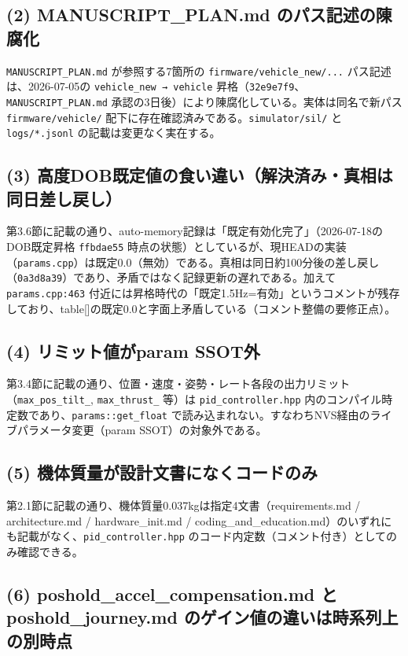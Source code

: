 \documentclass[a4paper,10pt]{ltjsarticle}
\begin{document}
\subsection*{(2) MANUSCRIPT\_PLAN.md のパス記述の陳腐化}

\texttt{MANUSCRIPT\_PLAN.md} が参照する7箇所の \texttt{firmware/vehicle\_new/...} パス記述は、2026-07-05の \texttt{vehicle\_new → vehicle} 昇格（\texttt{32e9e7f9}、\texttt{MANUSCRIPT\_PLAN.md} 承認の3日後）により陳腐化している。実体は同名で新パス \texttt{firmware/vehicle/} 配下に存在確認済みである。\texttt{simulator/sil/} と \texttt{logs/*.jsonl} の記載は変更なく実在する。

\subsection*{(3) 高度DOB既定値の食い違い（解決済み・真相は同日差し戻し）}

第3.6節に記載の通り、auto-memory記録は「既定有効化完了」（2026-07-18のDOB既定昇格 \texttt{ffbdae55} 時点の状態）としているが、現HEADの実装（\texttt{params.cpp}）は既定0.0（無効）である。真相は同日約100分後の差し戻し（\texttt{0a3d8a39}）であり、矛盾ではなく記録更新の遅れである。加えて \texttt{params.cpp:463} 付近には昇格時代の「既定1.5Hz=有効」というコメントが残存しており、table[]の既定0.0と字面上矛盾している（コメント整備の要修正点）。

\subsection*{(4) リミット値がparam SSOT外}

第3.4節に記載の通り、位置・速度・姿勢・レート各段の出力リミット（\texttt{max\_pos\_tilt\_}, \texttt{max\_thrust\_} 等）は \texttt{pid\_controller.hpp} 内のコンパイル時定数であり、\texttt{params::get\_float} で読み込まれない。すなわちNVS経由のライブパラメータ変更（param SSOT）の対象外である。

\subsection*{(5) 機体質量が設計文書になくコードのみ}

第2.1節に記載の通り、機体質量0.037kgは指定4文書（requirements.md / architecture.md / hardware\_init.md / coding\_and\_education.md）のいずれにも記載がなく、\texttt{pid\_controller.hpp} のコード内定数（コメント付き）としてのみ確認できる。

\subsection*{(6) poshold\_accel\_compensation.md と poshold\_journey.md のゲイン値の違いは時系列上の別時点}
\end{document}
